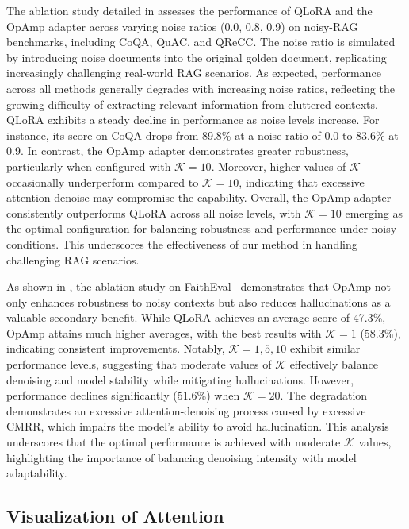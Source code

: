 The ablation study detailed in  assesses the performance of QLoRA and the OpAmp adapter across varying noise ratios (0.0, 0.8, 0.9) on noisy-RAG benchmarks, including CoQA, QuAC, and QReCC. 
The noise ratio is simulated by introducing noise documents into the original golden document, replicating increasingly challenging real-world RAG scenarios. 
As expected, performance across all methods generally degrades with increasing noise ratios, reflecting the growing difficulty of extracting relevant information from cluttered contexts.
QLoRA exhibits a steady decline in performance as noise levels increase. 
For instance, its score on CoQA drops from 89.8\% at a noise ratio of 0.0 to 83.6\% at 0.9. 
In contrast, the OpAmp adapter demonstrates greater robustness, particularly when configured with $\mathcal{K}=10$. 
Moreover, higher values of $\mathcal{K}$ occasionally underperform compared to $\mathcal{K}=10$, indicating that excessive attention denoise may compromise the capability.
Overall, the OpAmp adapter consistently outperforms QLoRA across all noise levels, with $\mathcal{K}=10$ emerging as the optimal configuration for balancing robustness and performance under noisy conditions. 
This underscores the effectiveness of our method in handling challenging RAG scenarios.

As shown in , the ablation study on FaithEval~\cite{ming2024faitheval} demonstrates that OpAmp not only enhances robustness to noisy contexts but also reduces hallucinations as a valuable secondary benefit. 
While QLoRA achieves an average score of 47.3\%, OpAmp attains much higher averages, with the best results with $\mathcal{K}=1$ (58.3\%), indicating consistent improvements. 
Notably, $\mathcal{K}=1, 5, 10$ exhibit similar performance levels, suggesting that moderate values of $\mathcal{K}$ effectively balance denoising and model stability while mitigating hallucinations. 
However, performance declines significantly (51.6\%) when $\mathcal{K}=20$.
The degradation demonstrates an excessive attention-denoising process caused by excessive CMRR, which impairs the model's ability to avoid hallucination.
This analysis underscores that the optimal performance is achieved with moderate $\mathcal{K}$ values, highlighting the importance of balancing denoising intensity with model adaptability.

\subsection{Visualization of Attention}

